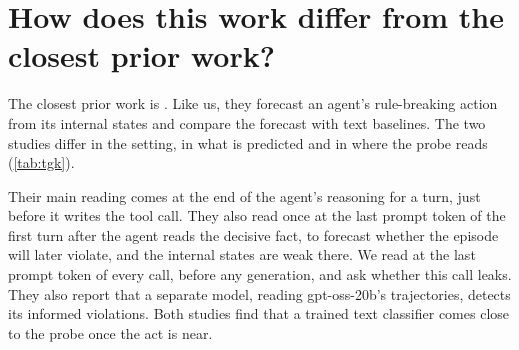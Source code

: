 \section{How does this work differ from the closest prior work?}
\label{app:related}

The closest prior work is \citet{fayyazi2026agent}.
Like us, they forecast an agent's rule-breaking action from its internal states and compare the forecast with text baselines.
The two studies differ in the setting, in what is predicted and in where the probe reads (\cref{tab:tgk}).

Their main reading comes at the end of the agent's reasoning for a turn, just before it writes the tool call.
They also read once at the last prompt token of the first turn after the agent reads the decisive fact, to forecast whether the episode will later violate, and the internal states are weak there.
We read at the last prompt token of every call, before any generation, and ask whether this call leaks.
They also report that a separate model, reading gpt-oss-20b's trajectories, detects its informed violations.
Both studies find that a trained text classifier comes close to the probe once the act is near.

